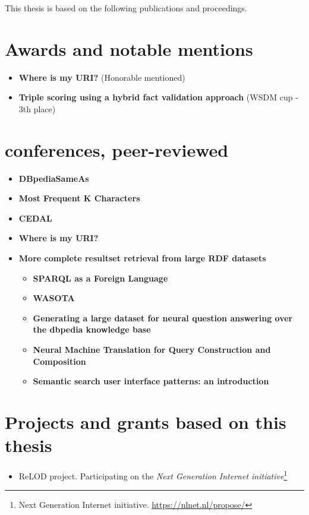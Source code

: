 This thesis is based on the following publications and proceedings.

\section{Awards and notable mentions}

\begin{itemize}
    \item \textbf{Where is my URI?} (Honorable mentioned) \cite{valdestilhas2018my}
    \item \textbf{Triple scoring using a hybrid fact validation approach} (WSDM cup - 3th place) \cite{marx2017triple}
\end{itemize}

\section{conferences, peer-reviewed}

\begin{itemize}
    \item \textbf{DBpediaSameAs} \cite{valdestilhas2015dbpediasameas}
    \item \textbf{Most Frequent K Characters} \cite{valdestilhas2017high}
    \item \textbf{CEDAL} \cite{valdestilhas2017cedal}
    \item \textbf{Where is my URI?} \cite{valdestilhas2018my}
    \item \textbf{More complete resultset retrieval from large RDF datasets} \cite{ValdestilhasKcap}
    \begin{itemize}
        \item \textbf{SPARQL as a Foreign Language} \cite{soru2017sparql}
        \item \textbf{WASOTA} \cite{neto2016wasota}
        \item \textbf{Generating a large dataset for neural question answering over the dbpedia knowledge base}        \cite{hartmann2018generating}
        \item \textbf{Neural Machine Translation for Query Construction and Composition} \cite{soru2018neural}
        \item \textbf{Semantic search user interface patterns: an introduction} \cite{marx2017semantic}
    \end{itemize}
\end{itemize}

\section{Projects and grants based on this thesis}
\begin{itemize}
    \item ReLOD project. Participating on the \textit{Next Generation Internet initiative}\footnote{Next Generation Internet initiative. \url{https://nlnet.nl/propose/}}
\end{itemize}

